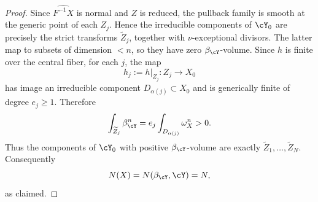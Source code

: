 \documentclass[12pt]{amsart}
\begin{document}
\begin{proof}
Since \(\widehat{F^{-1}X}\) is normal and \(Z\) is reduced, the pullback
family is smooth at the generic point of each \(Z_j\). Hence the
irreducible components of \(\cY_0\) are precisely the strict transforms
\(\widetilde Z_j\), together with \(\nu\)-exceptional divisors. The latter
map to subsets of dimension \(<n\), so they have zero \(\beta_\cY\)-volume.
Since \(h\) is finite over the central fiber, for each \(j\), the map
\[
h_j:=h|_{Z_j}\colon Z_j\to X_0
\]
has image an irreducible component \(D_{\alpha(j)}\subset X_0\) and is
generically finite of degree \(e_j\ge 1\). Therefore
\[
\int_{\widetilde Z_j}\beta_\cY^n
=
e_j\int_{D_{\alpha(j)}}\omega_X^n
>0.
\]
Thus the components of \(\cY_0\) with positive \(\beta_\cY\)-volume are
exactly \(\widetilde Z_1,\dots,\widetilde Z_N\). Consequently
\[
N(X)=N(\beta_\cY,\cY)=N,
\]
as claimed.
\end{proof}
\end{document}
